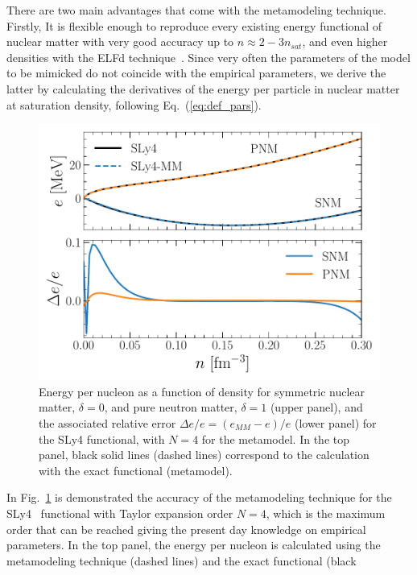There are two main advantages that come with the metamodeling technique.\\
Firstly, It is flexible enough to reproduce every existing energy functional of 
nuclear matter with very good accuracy up to $n \approx 2-3n_{sat}$, and even higher
densities with the ELFd technique~\cite{Margueron2018a}. Since very often the
parameters of the model to be mimicked do not coincide with the empirical
parameters, we derive the latter by calculating the derivatives of the energy 
per particle in nuclear matter at saturation density, following
Eq.~(\ref{eq:def_pars}).
%
\begin{figure}[!t]
\begin{center}
  \includegraphics[width=0.9\linewidth]{figures/mm_accuracy.pdf}
\end{center}
\caption[Accuracy of the metamodeling technique for SLy4]{Energy per 
  nucleon as a function of density for symmetric
  nuclear matter, $\delta=0$, and pure neutron matter, $\delta=1$ (upper panel), and the
associated relative error $\Delta e/e = (e_{MM} - e)/e$ (lower panel) for the SLy4
functional, with $N=4$ for the metamodel. In the top panel, black solid lines 
(dashed lines) correspond to the
calculation with the exact functional (metamodel).}\label{fig:mm_accuracy}
\end{figure}
%
In Fig.~\ref{fig:mm_accuracy} is demonstrated the accuracy of the metamodeling
technique for the SLy4~\cite{Chabanat1998} functional with Taylor expansion order $N=4$, which is
the maximum order that can be reached giving the present day knowledge on empirical
parameters. In the top panel, the energy per nucleon is calculated 
using the metamodeling technique (dashed lines) and the exact functional (black
